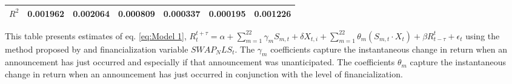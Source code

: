 \begin{sidewaystable}
{\begin{tabular}{@{}lllllllllllll@{}}
                                 \\ \textbf{$R^2$}             &\multicolumn{2}{c}{ 0.001962 }                                                 & \multicolumn{2}{c}{ 0.002064 }                                                 & \multicolumn{2}{c}{ 0.000809 }                                                 & \multicolumn{2}{c}{ 0.000337 }                                                 & \multicolumn{2}{c}{ 0.000195 }                                                   & \multicolumn{2}{c}{ 0.001226 }                                                 \\ \bottomrule 
\end{tabular}
}
\begin{tablenotes}\item 
    \singlespacing
    \footnotesize
    This table presents estimates of eq. \ref{eq:Model 1}, $R_{t}^{t+\tau}=\alpha+\sum_{m=1}^{22} \gamma_m S_{m,t}+ \delta X_{t,i} + \sum_{m=1}^{22} \theta_m (S_{m,t} \cdot X_t)+\beta R_{t-\tau}^{t}+\epsilon_{t}$ using the method proposed by \citet{kurov2019price} and financialization variable $SWAP_NLS_t$. The $\gamma_m$ coefficients capture the instantaneous change in return when an announcement has just occurred and especially if that announcement was unanticipated. The coefficients $\theta_m$ capture the instantaneous change in return when an announcement has just occurred in conjunction with the level of financialization.
\end{tablenotes}
\end{sidewaystable}


